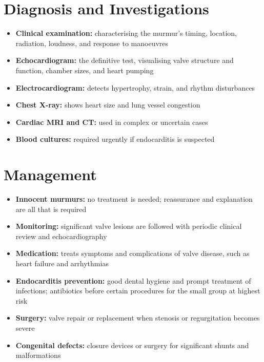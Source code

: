 \section*{Diagnosis and Investigations}
\begin{itemize}
    \item \textbf{Clinical examination:} characterising the murmur's timing, location, radiation, loudness, and response to manoeuvres
    \item \textbf{Echocardiogram:} the definitive test, visualising valve structure and function, chamber sizes, and heart pumping
    \item \textbf{Electrocardiogram:} detects hypertrophy, strain, and rhythm disturbances
    \item \textbf{Chest X-ray:} shows heart size and lung vessel congestion
    \item \textbf{Cardiac MRI and CT:} used in complex or uncertain cases
    \item \textbf{Blood cultures:} required urgently if endocarditis is suspected
\end{itemize}

\section*{Management}
\begin{itemize}
    \item \textbf{Innocent murmurs:} no treatment is needed; reassurance and explanation are all that is required
    \item \textbf{Monitoring:} significant valve lesions are followed with periodic clinical review and echocardiography
    \item \textbf{Medication:} treats symptoms and complications of valve disease, such as heart failure and arrhythmias
    \item \textbf{Endocarditis prevention:} good dental hygiene and prompt treatment of infections; antibiotics before certain procedures for the small group at highest risk
    \item \textbf{Surgery:} valve repair or replacement when stenosis or regurgitation becomes severe
    \item \textbf{Congenital defects:} closure devices or surgery for significant shunts and malformations
\end{itemize}


